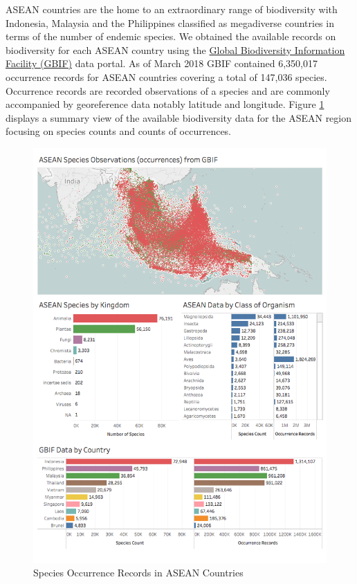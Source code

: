 \documentclass[openany]{book}
\theoremstyle{definition}
\theoremstyle{definition}
\theoremstyle{definition}
\theoremstyle{remark}
\begin{document}
ASEAN countries are the home to an extraordinary range of biodiversity
with Indonesia, Malaysia and the Philippines classified as megadiverse
countries in terms of the number of endemic species. We obtained the
available records on biodiversity for each ASEAN country using the
\href{https://www.gbif.org/}{Global Biodiversity Information Facility
(GBIF)} data portal. As of March 2018 GBIF contained 6,350,017
occurrence records for ASEAN countries covering a total of 147,036
species. Occurrence records are recorded observations of a species and
are commonly accompanied by georeference data notably latitude and
longitude. Figure \ref{fig:biodiv} displays a summary view of the
available biodiversity data for the ASEAN region focusing on species
counts and counts of occurrences.

\begin{figure}

{\centering \includegraphics[width=1\linewidth]{images/asean_biodiversity} 

}

\caption{Species Occurrence Records in ASEAN Countries}\label{fig:biodiv}
\end{figure}
\end{document}
